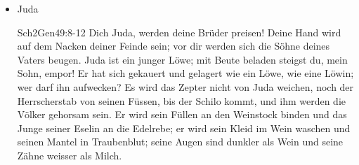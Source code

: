\begin{enumerate}
\begin{itemize}
\begin{bibeltext}{Sch2}{Gen}{27:28-29}
        \end{bibeltext}
        \begin{bibeltext}{Sch2}{Gen}{28:13-15}
            Und siehe, der \herr stand über ihr und sprach: Ich bin der \herr, der Gott deines Vaters Abraham und der Gott Isaak; das Land auf dem du liegst, will ich dir und deinem Samen geben. Und dein Same soll werden der Staub der Erde, und nach Westen, Osten, Norden und Süden sollst du dich ausbreiten; und dir und in deinem Samen sollen gesegnet werden alle Geschlechter der Erde! Und siehe, ich bin mit dir, und ich will dich behüten überall, wo du hinziehst, und dich wieder in dieses Land bringen. Denn ich will dich nicht verlassen, bis ich vollbracht habe, was ich dir zugesagt habe!
        \end{bibeltext}
        \begin{bibeltext}{Sch2}{Gen}{35:9-10}
            Und Gott erschien Jakob zum zweiten Mal, seit er aus Paddan-Aram gekommen war, und segnete ihn. Und Gott sprach: Dein Name ist Jakob, aber du sollst nicht mehr Jakob heissen, sondern Israel soll dein Name sein! Und so gab er ihm den Namen Israel!
        \end{bibeltext}
        \item Juda
        \begin{bibeltext}{Sch2}{Gen}{49:8-12}
            Dich Juda, werden deine Brüder preisen! Deine Hand wird auf dem Nacken deiner Feinde sein; vor dir werden sich die Söhne deines Vaters beugen. Juda ist ein junger Löwe; mit Beute beladen steigst du, mein Sohn, empor! Er hat sich gekauert und gelagert wie ein Löwe, wie eine Löwin; wer darf ihn aufwecken? Es wird das Zepter nicht von Juda weichen, noch der Herrscherstab von seinen Füssen, bis der Schilo kommt, und ihm werden die Völker gehorsam sein. Er wird sein Füllen an den Weinstock binden und das Junge seiner Eselin an die Edelrebe; er wird sein Kleid im Wein waschen und seinen Mantel in Traubenblut; seine Augen sind dunkler als Wein und seine Zähne weisser als Milch.
        \end{bibeltext}
    \end{itemize}
\end{enumerate}